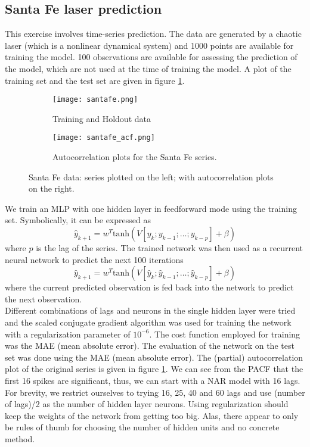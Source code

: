 \documentclass[paper=a4, fontsize=11pt]{scrartcl} %
\numberwithin{equation}{section} %
\begin{document}
\subsection{Santa Fe laser prediction}
This exercise involves time-series prediction. The data are generated by a chaotic laser (which is a nonlinear dynamical system) and 1000 points are available for training the model. 100 observations are available for assessing the prediction of the model, which are not used at the time of training the model. A plot of the training set and the test set are given in figure \ref{santafe}.\\

\begin{figure}[ht]
\begin{subfigure}[b]{0.5\textwidth}
\centering
\texttt{[image: santafe.png]}
\caption{Training and Holdout data}
\end{subfigure}
\begin{subfigure}[b]{0.5\textwidth}
	\centering
	\texttt{[image: santafe\_acf.png]}
	\caption{Autocorrelation plots for the Santa Fe series.}
\end{subfigure}
\caption{Santa Fe data: series plotted on the left; with autocorrelation plots on the right.}
\label{santafe}
\end{figure}

We train an MLP with one hidden layer in feedforward mode using the training set. Symbolically, it can be expressed as $$\hat{y}_{k+1} = w^T\mathrm{tanh}(V[y_k; y_{k-1}; \ldots ; y_{k-p}] + \beta)$$ where $p$ is the lag of the series. The trained network was then used as a recurrent neural network to predict the next 100 iterations $$\hat{y}_{k+1} = w^T\mathrm{tanh}(V[\hat{y}_k; \hat{y}_{k-1}; \ldots ; \hat{y}_{k-p}] + \beta)$$ where the current predicted observation is fed back into the network to predict the next observation.\\

Different combinations of lags and neurons in the single hidden layer were tried and the scaled conjugate gradient algorithm was used for training the network with a regularization parameter of $10^{-6}$.  The cost function employed for training was the MAE (mean absolute error). The evaluation of the network on the test set was done using the MAE (mean absolute error). The (partial) autocorrelation plot of the original series is given in figure \ref{santafe}. We can see from the PACF that the first 16 spikes are significant, thus, we can start with a NAR model with 16 lags. For brevity, we restrict ourselves to trying 16, 25, 40 and 60 lags and use (number of lags)/2 as the number of hidden layer neurons. Using regularization should keep the weights of the network from getting too big. Alas, there appear to only be rules of thumb for choosing the number of hidden units and no concrete method.\\ 
\end{document}
